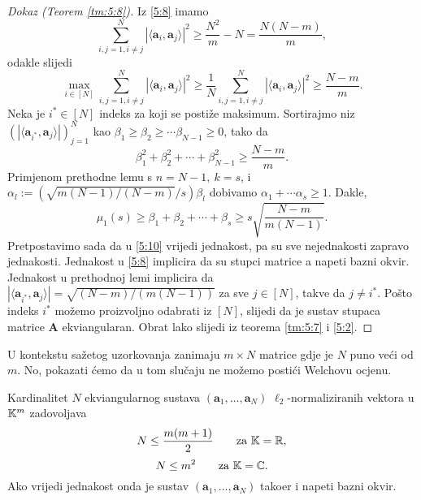 \documentclass[a4paper,twoside,12pt]{memoir} %
\newcommand{\vect}[1]{\mathbf{#1}}
\renewcommand{\vec}{\vect}
\begin{document}
\begin{proof}[Dokaz (Teorem \ref{tm:5:8})]
    Iz \eqref{5:8} imamo 
    \begin{equation*}
        \sum_{i,j=1,i \neq j}^N |\langle \vec a_i, \vec a_j \rangle|^2 \geq \frac{N^2}{m} - N = \frac{N(N-m)}{m},
    \end{equation*}
    odakle slijedi
    \begin{equation*}
        \max_{i \in [N]} \sum_{i,j=1,i \neq j}^N |\langle \vec a_i, \vec a_j \rangle|^2 \geq \frac{1}{N} \sum_{i,j=1,i \neq j}^N |\langle \vec a_i, \vec a_j \rangle|^2 \geq \frac{N-m}{m} .
    \end{equation*}
    Neka je $i^* \in [N]$ indeks za koji se posti\v{z}e maksimum. Sortirajmo niz $(|\langle \vec a_{i^*}, \vec a_j \rangle|)_{j=1}^{N}$ kao $\beta_1 \geq \beta_2 \geq \cdots \beta_{N-1} \geq 0$, tako da
    \begin{equation*}
        \beta_1^2 + \beta_2^2 + \cdots + \beta_{N-1}^2 \geq \frac{N-m}{m} .
    \end{equation*}
    Primjenom prethodne lemu s $n = N-1,\ k = s$, i $\alpha_l := (\sqrt{m(N-1)/(N-m)}/s)\beta_l$ dobivamo $\alpha_1 + \cdots \alpha_s \geq 1$. Dakle,
    \begin{equation*}
        \mu_1(s) \geq \beta_1 + \beta_2 + \cdots + \beta_s \geq s \sqrt{\frac{N-m}{m(N-1)}}.
    \end{equation*}
    Pretpostavimo sada da u \eqref{5:10} vrijedi jednakost, pa su sve nejednakosti zapravo jednakosti. Jednakost u \eqref{5:8} implicira da su stupci matrice a napeti bazni okvir. Jednakost u prethodnoj lemi implicira da $|\langle \vec a_{i^*}, \vec a_j \rangle| = \sqrt{(N-m)/(m(N-1))}$ za sve $j \in [N]$, takve da $j \neq i^*$. Po\v{s}to indeks $i^*$ mo\v{z}emo proizvoljno odabrati iz $[N]$, slijedi da je sustav stupaca matrice $\vec A$ ekviangularan. Obrat lako slijedi iz teorema \ref{tm:5:7} i \eqref{5:2}.
\end{proof}

U kontekstu sa\v{z}etog uzorkovanja zanimaju $m \times N$ matrice gdje je $N$ puno ve\'ci od $m$. No, pokazati \'cemo da u tom slu\v{c}aju ne mo\v{z}emo posti\'ci Welchovu ocjenu.
\begin{thm}\label{tm:5:10}
    Kardinalitet $N$ ekviangularnog sustava $(\vec a_1, \dots, \vec a_N)$ $\ell_2$-normaliziranih vektora u $\mathbb{K}^m$ zadovoljava
    \begin{equation*}
        N \leq \frac{m(m+1)}{2} \quad \quad \text{za } \mathbb{K} = \mathbb{R}, 
    \end{equation*}
    \begin{equation*}
        N \leq m^2 \quad \quad \text{za } \mathbb{K} = \mathbb{C}.
    \end{equation*}
    Ako vrijedi jednakost onda je sustav $(\vec a_1, \dots, \vec a_N)$ tako\dj er i napeti bazni okvir.
\end{thm}
\end{document}
